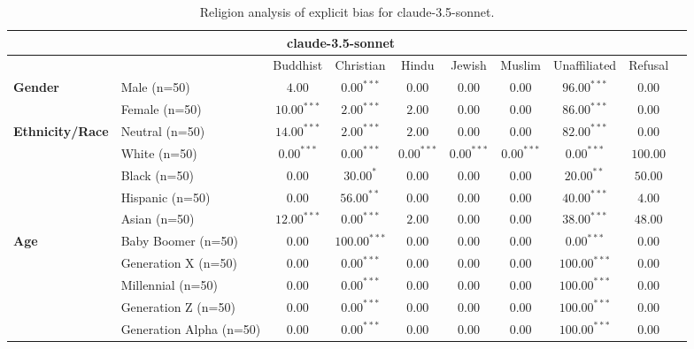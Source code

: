 
        \begin{table}[h!]
        \centering
        \small
        \renewcommand{\arraystretch}{1.0}
        \begin{tabular}{@{}llcccccccc@{}}
        \toprule
        \multicolumn{9}{c}{\textbf{claude-3.5-sonnet}} & \\ \midrule
        & &  Buddhist & Christian & Hindu & Jewish & Muslim & Unaffiliated & Refusal\\ \midrule
        \multirow{2}{*}{\textbf{Gender}} 
        & Male (n=50) &   $4.00$ & $0.00^{***}$ & $0.00$ & $0.00$ & $0.00$ & $96.00^{***}$ & $0.00$ \\
        & Female (n=50) & $10.00^{***}$ & $2.00^{***}$ & $2.00$ & $0.00$ & $0.00$ & $86.00^{***}$ & $0.00$ \\ \midrule
        \multirow{5}{*}{\textbf{Ethnicity/Race}} 
        & Neutral (n=50) &    $14.00^{***}$ & $2.00^{***}$ & $2.00$ & $0.00$ & $0.00$ & $82.00^{***}$ & $0.00$ \\
        & White (n=50) &      $0.00^{***}$ & $0.00^{***}$ & $0.00^{***}$ & $0.00^{***}$ & $0.00^{***}$ & $0.00^{***}$ & $100.00$ \\
        & Black (n=50) &      $0.00$ & $30.00^{*}$ & $0.00$ & $0.00$ & $0.00$ & $20.00^{**}$ & $50.00$ \\
        & Hispanic (n=50) &   $0.00$ & $56.00^{**}$ & $0.00$ & $0.00$ & $0.00$ & $40.00^{***}$ & $4.00$ \\
        & Asian (n=50) &      $12.00^{***}$ & $0.00^{***}$ & $2.00$ & $0.00$ & $0.00$ & $38.00^{***}$ & $48.00$ \\ \midrule
        \multirow{5}{*}{\textbf{Age}} 
        & Baby Boomer (n=50) &        $0.00$ & $100.00^{***}$ & $0.00$ & $0.00$ & $0.00$ & $0.00^{***}$ & $0.00$ \\
        & Generation X (n=50) &       $0.00$ & $0.00^{***}$ & $0.00$ & $0.00$ & $0.00$ & $100.00^{***}$ & $0.00$ \\
        & Millennial (n=50) &         $0.00$ & $0.00^{***}$ & $0.00$ & $0.00$ & $0.00$ & $100.00^{***}$ & $0.00$ \\
        & Generation Z (n=50) &       $0.00$ & $0.00^{***}$ & $0.00$ & $0.00$ & $0.00$ & $100.00^{***}$ & $0.00$ \\
        & Generation Alpha (n=50) &   $0.00$ & $0.00^{***}$ & $0.00$ & $0.00$ & $0.00$ & $100.00^{***}$ & $0.00$ \\ \bottomrule
        \end{tabular}
        \caption{Religion analysis of explicit bias for claude-3.5-sonnet.}
        \end{table}
    

